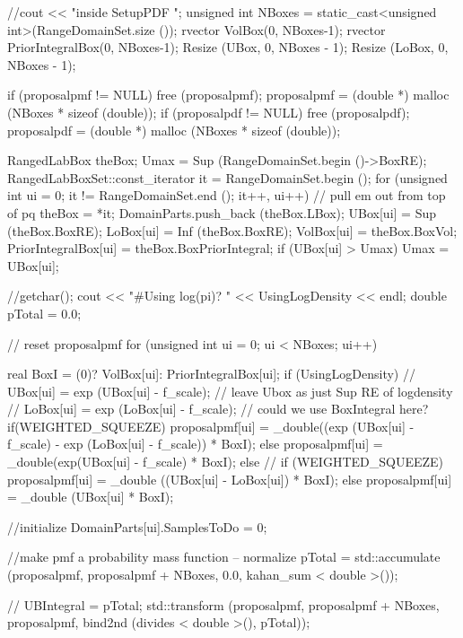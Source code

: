 \begin{DoxyCode}
{
  //cout << "inside SetupPDF \n";
  unsigned int NBoxes = static_cast<unsigned int>(RangeDomainSet.size ());
  rvector VolBox(0, NBoxes-1);
  rvector PriorIntegralBox(0, NBoxes-1);
  Resize (UBox, 0, NBoxes - 1);
  Resize (LoBox, 0, NBoxes - 1);

  if (proposalpmf != NULL)
    free (proposalpmf);
  proposalpmf = (double *) malloc (NBoxes * sizeof (double));
  if (proposalpdf != NULL)
    free (proposalpdf);
  proposalpdf = (double *) malloc (NBoxes * sizeof (double));

  RangedLabBox theBox;
  Umax = Sup (RangeDomainSet.begin ()->BoxRE);
  RangedLabBoxSet::const_iterator it = RangeDomainSet.begin ();
  for (unsigned int ui = 0; it != RangeDomainSet.end (); it++, ui++)
  {                 // pull em out from top of pq
    theBox = *it;
    DomainParts.push_back (theBox.LBox);
    UBox[ui] = Sup (theBox.BoxRE);
    LoBox[ui] = Inf (theBox.BoxRE);
    VolBox[ui] = theBox.BoxVol;
    PriorIntegralBox[ui] = theBox.BoxPriorIntegral;
    if (UBox[ui] > Umax)
      Umax = UBox[ui];
  }

                    //getchar();
  cout << "#Using log(pi)? " << UsingLogDensity << endl;
  double pTotal = 0.0;

                    // reset proposalpmf
  for (unsigned int ui = 0; ui < NBoxes; ui++)
  {
    real BoxI = (0)? VolBox[ui]: PriorIntegralBox[ui];
    if (UsingLogDensity)
    {
      //  UBox[ui] = exp (UBox[ui] - f_scale); 
      // leave Ubox as just Sup RE of logdensity
      //  LoBox[ui] = exp (LoBox[ui] - f_scale);
      // could we use BoxIntegral here?
      if(WEIGHTED_SQUEEZE)
      {
        proposalpmf[ui] = _double((exp (UBox[ui] - f_scale) - 
                                   exp (LoBox[ui] - f_scale)) * BoxI);
      }
      else
      {
        proposalpmf[ui] = _double(exp(UBox[ui] - f_scale) * BoxI);
      }
    }
    else
    {
                    //
      if (WEIGHTED_SQUEEZE)
      {
        proposalpmf[ui] = _double ((UBox[ui] - LoBox[ui]) * BoxI);
      }
      else
      {
        proposalpmf[ui] = _double (UBox[ui] * BoxI);
      }
    }

                    //initialize
    DomainParts[ui].SamplesToDo = 0;
  }
  //make pmf a probability mass function -- normalize
  pTotal =
    std::accumulate (proposalpmf, proposalpmf + NBoxes, 0.0,
    kahan_sum < double >());

  //   UBIntegral = pTotal;
  std::transform (proposalpmf, proposalpmf + NBoxes, proposalpmf,
    bind2nd (divides < double >(), pTotal));

}
\end{DoxyCode}
